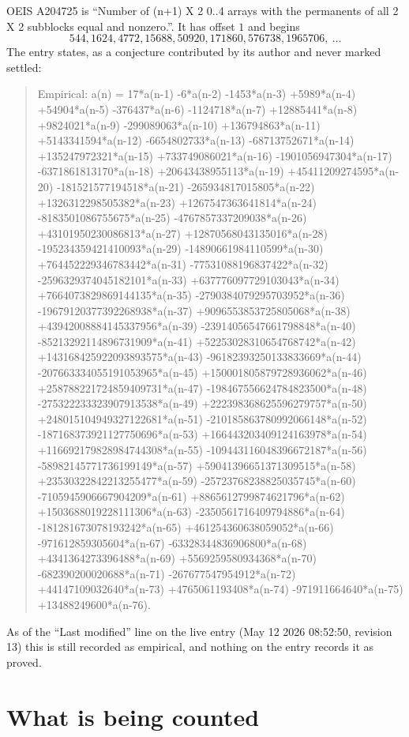 \documentclass[11pt,a4paper]{article}
\theoremstyle{plain}
\theoremstyle{definition}
\begin{document}
OEIS A204725 is ``Number of (n+1) X 2 0..4 arrays with the permanents of all 2 X 2 subblocks equal and nonzero.''. It has offset $1$ and begins
\[
544, 1624, 4772, 15688, 50920, 171860, 576738, 1965706,\ \dots
\]
The entry states, as a conjecture contributed by its author and never marked settled:
\begin{quote}
Empirical: a(n) = 17*a(n-1) -6*a(n-2) -1453*a(n-3) +5989*a(n-4) +54904*a(n-5) -376437*a(n-6) -1124718*a(n-7) +12885441*a(n-8) +9824021*a(n-9) -299089063*a(n-10) +136794863*a(n-11) +5143341594*a(n-12) -6654802733*a(n-13) -68713752671*a(n-14) +135247972321*a(n-15) +733749086021*a(n-16) -1901056947304*a(n-17) -6371861813170*a(n-18) +20643438955113*a(n-19) +45411209274595*a(n-20) -181521577194518*a(n-21) -265934817015805*a(n-22) +1326312298505382*a(n-23) +1267547363641814*a(n-24) -8183501086755675*a(n-25) -4767857337209038*a(n-26) +43101950230086813*a(n-27) +12870568043135016*a(n-28) -195234359421410093*a(n-29) -14890661984110599*a(n-30) +764452229346783442*a(n-31) -77531088196837422*a(n-32) -2596329374045182101*a(n-33) +637776097729103043*a(n-34) +7664073829869144135*a(n-35) -2790384079295703952*a(n-36) -19679120377392268938*a(n-37) +9096553853725805068*a(n-38) +43942008884145337956*a(n-39) -23914056547661798848*a(n-40) -85213292114896731909*a(n-41) +52253028310654768742*a(n-42) +143168425922093893575*a(n-43) -96182393250133833669*a(n-44) -207663334055191053965*a(n-45) +150001805879728936062*a(n-46) +258788221724859409731*a(n-47) -198467556624784823500*a(n-48) -275322233323907913538*a(n-49) +222398368625596279757*a(n-50) +248015104949327122681*a(n-51) -210185863780992066148*a(n-52) -187168373921127750696*a(n-53) +166443203409124163978*a(n-54) +116692179828984744308*a(n-55) -109443116048396672187*a(n-56) -58982145771736199149*a(n-57) +59041396651371309515*a(n-58) +23530322842213255477*a(n-59) -25723768238825035745*a(n-60) -7105945906667904209*a(n-61) +8865612799874621796*a(n-62) +1503688019228111306*a(n-63) -2350561716409794886*a(n-64) -181281673078193242*a(n-65) +461254360638059052*a(n-66) -971612859305604*a(n-67) -63328344836906800*a(n-68) +4341364273396488*a(n-69) +5569259580934368*a(n-70) -682390200020688*a(n-71) -267677547954912*a(n-72) +44147109032640*a(n-73) +4765061193408*a(n-74) -971911664640*a(n-75) +13488249600*a(n-76).
\end{quote}
As of the ``Last modified'' line on the live entry (May 12 2026 08:52:50, revision 13) this is still
recorded as empirical, and nothing on the entry records it as proved.

\section{What is being counted}
\end{document}
